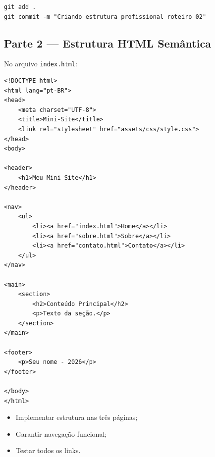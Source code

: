 \documentclass[12pt,a4paper]{article}
\begin{document}
\begin{boxAtividade}

\begin{boxCodigo}
\begin{verbatim}
git add .
git commit -m "Criando estrutura profissional roteiro 02"
\end{verbatim}
\end{boxCodigo}

\end{boxAtividade}


\subsection{Parte 2 — Estrutura HTML Semântica}
No arquivo \texttt{index.html}:

\begin{boxCodigo}
\begin{verbatim}
<!DOCTYPE html>
<html lang="pt-BR">
<head>
    <meta charset="UTF-8">
    <title>Mini-Site</title>
    <link rel="stylesheet" href="assets/css/style.css">
</head>
<body>

<header>
    <h1>Meu Mini-Site</h1>
</header>

<nav>
    <ul>
        <li><a href="index.html">Home</a></li>
        <li><a href="sobre.html">Sobre</a></li>
        <li><a href="contato.html">Contato</a></li>
    </ul>
</nav>

<main>
    <section>
        <h2>Conteúdo Principal</h2>
        <p>Texto da seção.</p>
    </section>
</main>

<footer>
    <p>Seu nome - 2026</p>
</footer>

</body>
</html>
\end{verbatim}
\end{boxCodigo}

\begin{boxAtividade}

\begin{itemize}
\item Implementar estrutura nas três páginas;
\item Garantir navegação funcional;
\item Testar todos os links.
\end{itemize}

\end{boxAtividade}
\end{document}
